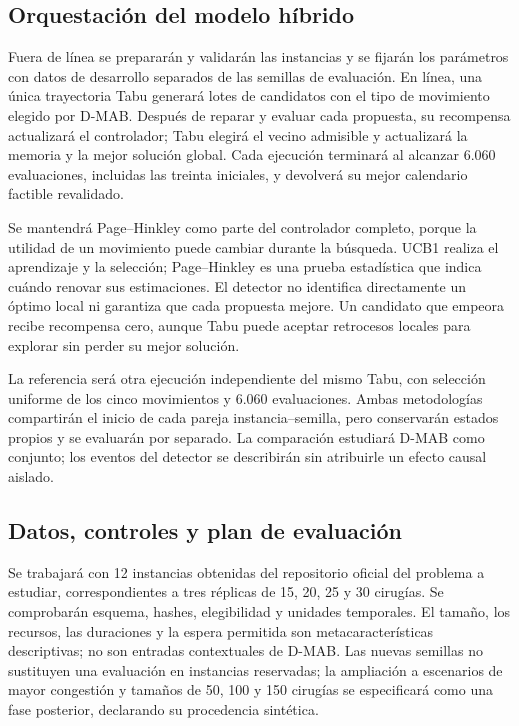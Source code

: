 \documentclass[12pt,letterpaper]{report}
\begin{document}
\clearpage
\subsection{Orquestación del modelo híbrido}
Fuera de línea se prepararán y validarán las instancias y se fijarán los
parámetros con datos de desarrollo separados de las semillas de evaluación.
En línea, una única trayectoria Tabu generará lotes de candidatos con el
tipo de movimiento elegido por D-MAB. Después de reparar y evaluar cada
propuesta, su recompensa actualizará el controlador; Tabu elegirá el vecino
admisible y actualizará la memoria y la mejor solución global. Cada
ejecución terminará al alcanzar 6.060 evaluaciones, incluidas las treinta
iniciales, y devolverá su mejor calendario factible revalidado.

Se mantendrá Page--Hinkley como parte del controlador completo, porque la
utilidad de un movimiento puede cambiar durante la búsqueda. UCB1 realiza
el aprendizaje y la selección; Page--Hinkley es una prueba estadística
que indica cuándo renovar sus estimaciones. El detector no identifica
directamente un óptimo local ni garantiza que cada propuesta mejore.
Un candidato que empeora recibe recompensa cero, aunque Tabu puede aceptar
retrocesos locales para explorar sin perder su mejor solución.

La referencia será otra ejecución independiente del mismo Tabu, con
selección uniforme de los cinco movimientos y 6.060 evaluaciones.
Ambas metodologías compartirán el inicio de cada pareja instancia--semilla,
pero conservarán estados propios y se evaluarán por separado.
La comparación estudiará D-MAB como conjunto; los eventos del detector
se describirán sin atribuirle un efecto causal aislado.

\subsection{Datos, controles y plan de evaluación}
Se trabajará con 12 instancias obtenidas del repositorio oficial del problema
a estudiar, correspondientes a tres réplicas de 15, 20, 25 y 30 cirugías.
Se comprobarán esquema, hashes, elegibilidad y unidades temporales. El tamaño,
los recursos, las duraciones y la espera permitida son metacaracterísticas descriptivas;
no son entradas contextuales de D-MAB. Las nuevas semillas no sustituyen una
evaluación en instancias reservadas; la ampliación a escenarios de mayor
congestión y tamaños de 50, 100 y 150 cirugías se especificará como una fase
posterior, declarando su procedencia sintética.
\end{document}
